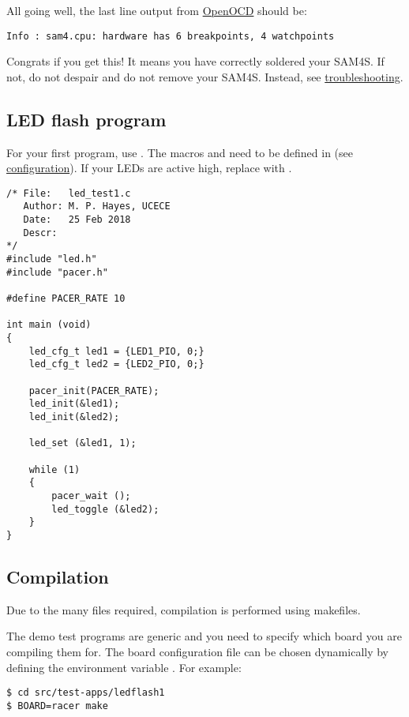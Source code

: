 All going well, the last line output from \url{OpenOCD} should be:

\begin{verbatim}
Info : sam4.cpu: hardware has 6 breakpoints, 4 watchpoints
\end{verbatim}

Congrats if you get this! It means you have correctly soldered your
SAM4S. If not, do not despair and do not remove your SAM4S. Instead,
see \protect\hyperref[troubleshooting]{troubleshooting}.


\subsection{LED flash program}
\label{led-flash-program}

For your first program, use
. The macros
 and  need to be defined in
 (see
\protect\hyperref[configuration]{configuration}). If your LEDs are
active high, replace  with .

\begin{verbatim}
/* File:   led_test1.c
   Author: M. P. Hayes, UCECE
   Date:   25 Feb 2018
   Descr: 
*/
#include "led.h"
#include "pacer.h"

#define PACER_RATE 10

int main (void)
{
    led_cfg_t led1 = {LED1_PIO, 0;}
    led_cfg_t led2 = {LED2_PIO, 0;}

    pacer_init(PACER_RATE);
    led_init(&led1);
    led_init(&led2);

    led_set (&led1, 1);

    while (1)
    {
        pacer_wait ();
        led_toggle (&led2);
    }
}
\end{verbatim}

\subsection{Compilation}
\label{compilation}

Due to the many files required, compilation is performed using
makefiles.

The demo test programs are generic and you need to specify which board
you are compiling them for. The board configuration file can be chosen
dynamically by defining the environment variable . For
example:
%
\begin{verbatim}
$ cd src/test-apps/ledflash1
$ BOARD=racer make
\end{verbatim}

